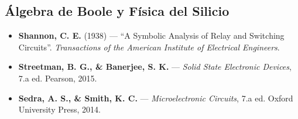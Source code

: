 \documentclass[11pt, letterpaper]{article}
\begin{document}
\subsection*{\'Algebra de Boole y F\'isica del Silicio}
\begin{itemize}
  \item \textbf{Shannon, C. E.} (1938) --- ``A Symbolic Analysis of Relay and Switching Circuits''. \textit{Transactions of the American Institute of Electrical Engineers}.
  \item \textbf{Streetman, B. G., \& Banerjee, S. K.} --- \emph{Solid State Electronic Devices}, 7.a ed. Pearson, 2015. 
  \item \textbf{Sedra, A. S., \& Smith, K. C.} --- \emph{Microelectronic Circuits}, 7.a ed. Oxford University Press, 2014. 
\end{itemize}
\end{document}

